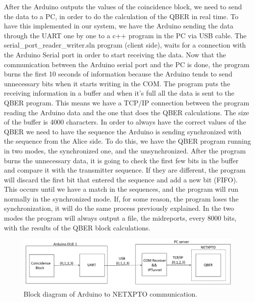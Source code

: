 \begin{refsection}
\begin{figure}[H]
\end{figure}


 After the Arduino outputs the values of the coincidence block, we need to send the data to a PC, in order to do the calculation of the QBER in real time. To have this implemented in our system, we have the Arduino sending the data through the UART one by one to a c++ program in the PC via USB cable. The serial\_port\_reader\_writer.sln program (client side), waits for a connection with the Arduino Serial port in order to start receiving the data. Now that the communication between the Arduino serial port and the PC is done, the program burns the first 10 seconds of information because the Arduino tends to send unnecessary bits when it starts writing in the COM. The program puts the receiving information in a buffer and when it's full all the data is sent to the QBER program. This means we have a TCP/IP connection between the program reading the Arduino data and the one that does the QBER calculations. The size of the buffer is 4000 characters. In order to always have the correct values of the QBER we need to have the sequence the Arduino is sending synchronized with the sequence from the Alice side. To do this, we have the QBER program running in two modes, the synchronized one, and the unsynchronized. After the program burns the unnecessary data, it is going to check the first few bits in the buffer and compare it with the transmitter sequence. If they are different, the program will discard the first bit that entered the sequence and add a new bit (FIFO). This occurs until we have a match in the sequences, and the program will run normally in the synchronized mode. If, for some reason, the program loses the synchronization, it will do the same process previously explained. In the two modes the program will always output a file, the midreports, every 8000 bits, with the results of the QBER block calculations.
	
	\begin{figure}[H]
		\centering
		\includegraphics[width=1.1\linewidth]{./sdf/arduino_quantum_rx/figures/PC.png}
		\caption{Block diagram of Arduino to NETXPTO communication.}
		\label{fig:netxpto}
	\end{figure}
	

\end{refsection}
